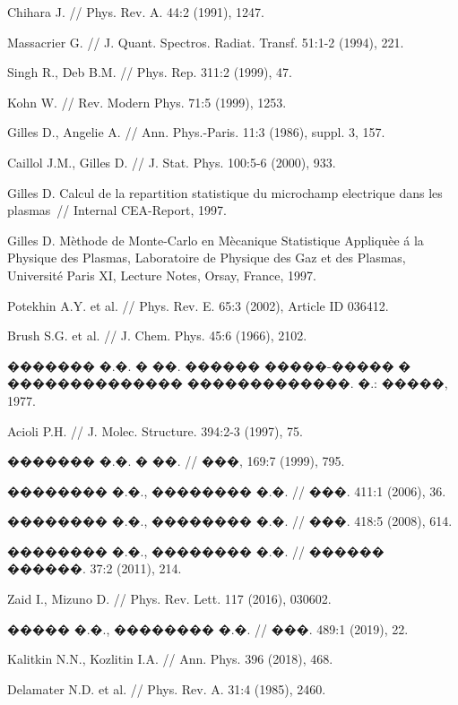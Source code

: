\documentclass[12pt,titlepage]{article}
\begin{document}
\begin{thebibliography}{99}
 Chihara J.  // Phys. Rev. A. 44:2 (1991), 1247.

 Massacrier G. // J. Quant. Spectros. Radiat. Transf. 51:1-2 (1994), 221.

 Singh R., Deb B.M. // Phys. Rep. 311:2 (1999), 47.

 Kohn W. // Rev. Modern Phys. 71:5 (1999), 1253.

 Gilles D., Angelie A. // Ann. Phys.-Paris. 11:3 (1986), suppl. 3, 157.

 Caillol J.M., Gilles D. // J. Stat. Phys. 100:5-6 (2000), 933.

 Gilles D. Calcul de la repartition statistique du microchamp electrique dans les plasmas~// Internal CEA-Report, 1997.

 Gilles D. M\`ethode de Monte-Carlo en M\`ecanique Statistique Appliqu\`ee \'a la Physique des Plasmas, Laboratoire de Physique des Gaz et des Plasmas, Universit\'e Paris XI, Lecture Notes, Orsay, France, 1997.

 Potekhin A.Y. et al. // Phys. Rev. E. 65:3 (2002), Article ID 036412.

 Brush S.G. et al. // J. Chem. Phys. 45:6 (1966), 2102.

 ������� �.�. � ��. ������ �����-����� � �������������� �������������. �.: �����, 1977.

 Acioli P.H. // J. Molec. Structure. 394:2-3 (1997), 75.

 ������� �.�. � ��. // ���, 169:7 (1999), 795.

 �������� �.�., �������� �.�. // ���. 411:1 (2006), 36.

 �������� �.�., �������� �.�. // ���. 418:5 (2008), 614.

 �������� �.�., �������� �.�. // ������ ������. 37:2 (2011), 214.

 Zaid I., Mizuno D. // Phys. Rev. Lett. 117 (2016), 030602.

 ����� �.�., �������� �.�. // ���. 489:1 (2019), 22.

 Kalitkin N.N., Kozlitin I.A. // Ann. Phys. 396 (2018), 468.

 Delamater N.D. et al. // Phys. Rev. A. 31:4 (1985), 2460.


\end{thebibliography}
\end{document}
